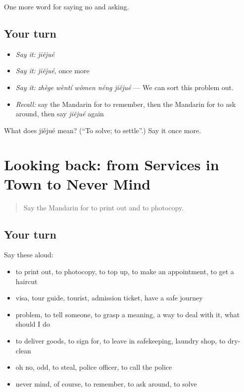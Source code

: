 \begin{grammarlens}[title={What you've built}]
One more word for saying no and asking.
\end{grammarlens}

\subsection*{Your turn}
\begin{itemize}
\raggedright
  \item \emph{Say it:} \emph{jiějué}
  \item \emph{Say it:} \emph{jiějué}, once more
  \item \emph{Say it:} \emph{zhège wèntí wǒmen néng jiějué} — We can sort this problem out.
  \item \emph{Recall:} say the Mandarin for to remember, then the Mandarin for to ask around, then say \emph{jiějué} again
\end{itemize}

\begin{tcolorbox}[breakable,colback=teal!4,colframe=teal!35!black,title={Before you move on}]
What does jiějué mean? (\textquotedblleft{}To solve; to settle\textquotedblright{}.) Say it once more.
\end{tcolorbox}
\section[(dialogue)]{Looking back: from Services in Town to Never Mind}

\label{lesson:ZH-R217-review-212-217}



\begin{quote}
Say the Mandarin for to print out and to photocopy.
\end{quote}

\subsection*{Your turn}
Say these aloud:

\begin{itemize}
\raggedright
  \item to print out, to photocopy, to top up, to make an appointment, to get a haircut
  \item visa, tour guide, tourist, admission ticket, have a safe journey
  \item problem, to tell someone, to grasp a meaning, a way to deal with it, what should I do
  \item to deliver goods, to sign for, to leave in safekeeping, laundry shop, to dry-clean
  \item oh no, odd, to steal, police officer, to call the police
  \item never mind, of course, to remember, to ask around, to solve
\end{itemize}

